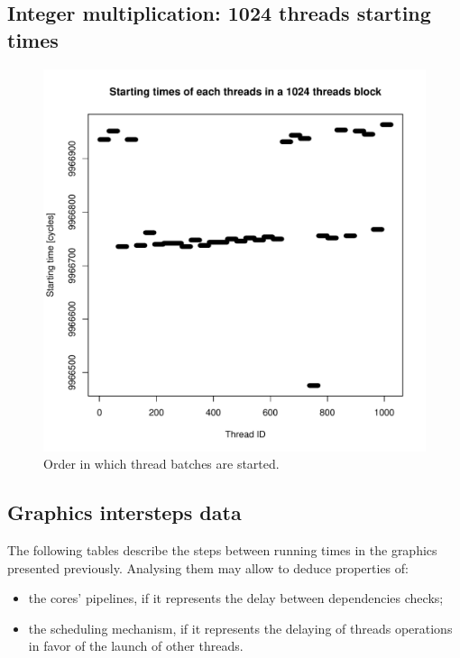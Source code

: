 \documentclass{article}
\def \scalingfactor{.8}
\begin{document}
	\subsection{Integer multiplication: 1024 threads starting times}
    \begin{figure}[h]
    		\centering
		\vspace{-20pt}
	    	\includegraphics[width=\scalingfactor\linewidth]{"graphics/starting_times_ratio31"}
	    	\vspace{-15pt}
	    	\captionsetup{justification=centering}    
	    	\caption{Order in which thread batches are started.}
    \end{figure}

    \subsection{Graphics intersteps data}
    The following tables describe the steps between running times in the graphics presented previously. Analysing them may allow to deduce properties of: 
    \begin{itemize} 
        \item the cores' pipelines, if it represents the delay between dependencies checks;
        \item the scheduling mechanism, if it represents the delaying of threads operations in favor of the launch of other threads.
    \end{itemize}
    \centering
    
    
    \pagebreak
    
\end{document}
